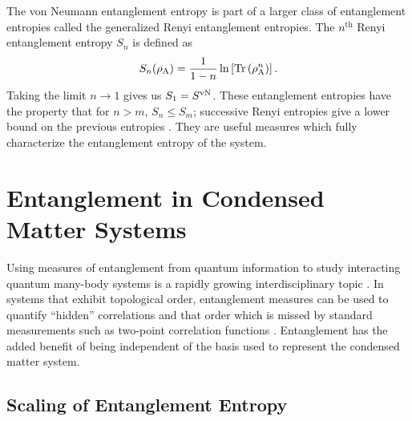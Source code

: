 The von Neumann entanglement entropy is part of a larger class of entanglement entropies called the generalized Renyi entanglement entropies.
The $n^\text{th}$ Renyi entanglement entropy $S_n$ is defined as
\begin{equation} \label{renyi}
 	S_n(\rho_{\rm A}) = \frac{1}{1-n}\ln\left[{\rm Tr}\left( \rho_{\rm A}^n \right) \right].
\end{equation}
Taking the limit $n\to1$ gives us $S_1 = S^{\text{vN}}$.  These entanglement entropies have the property that for $n>m$, $S_n\le S_m$; successive Renyi entropies give a lower bound on the previous entropies \cite{renyiproof}. They are useful measures which fully characterize the entanglement entropy of the system.



\section{Entanglement in Condensed Matter Systems}

Using measures of entanglement from quantum information to study interacting quantum many-body systems is a rapidly growing interdisciplinary topic \cite{Amico, intro}.
In systems that exhibit topological order, entanglement measures can be used to quantify ``hidden'' correlations \cite{wolf} and that order which is missed by standard measurements such as two-point correlation functions \cite{Bbob, KP, LW, Spectrum}.
Entanglement has the added benefit of being independent of the basis used to represent the condensed matter system.

\subsection{Scaling of Entanglement Entropy}
\label{1dcft}

